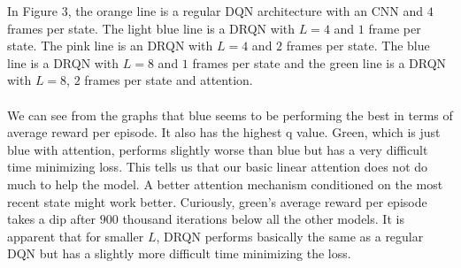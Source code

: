 \documentclass{article}
\begin{document}
In Figure 3, the orange line is a regular DQN architecture with an CNN and $4$
frames per state. The light blue line is a DRQN with $L=4$ and $1$ frame per state.
The pink line is an DRQN with $L=4$ and $2$ frames per state. The blue line is a
DRQN with $L=8$ and $1$ frames per state and the green line is a DRQN with $L=8$,
$2$ frames per state and attention. \\
\\
We can see from the graphs that blue seems to be performing the best in terms of
average reward per episode. It also has the highest q value. Green, which is just
blue with attention, performs slightly worse than blue but has a very difficult
time minimizing loss. This tells us that our basic linear attention does not do
much to help the model. A better attention mechanism conditioned on the most recent
state might work better. Curiously, green's average reward per episode takes a
dip after $900$ thousand iterations below all the other models. It is apparent
that for smaller $L$, DRQN performs basically the same as a regular DQN but has a
slightly more difficult time minimizing the loss. \\
\\
\end{document}
